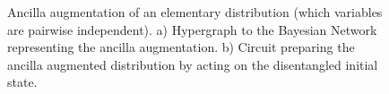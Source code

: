 \begin{example}
\begin{figure}
\begin{center}
        \end{center}
        \caption{Ancilla augmentation of an elementary distribution (which variables are pairwise independent).
        a) Hypergraph to the Bayesian Network representing the ancilla augmentation.
        b) Circuit preparing the ancilla augmented distribution by \activationCircuits{} acting on the disentangled initial state.
        }\label{fig:ancillaAugmentationElementary}
    \end{figure}

\end{example}